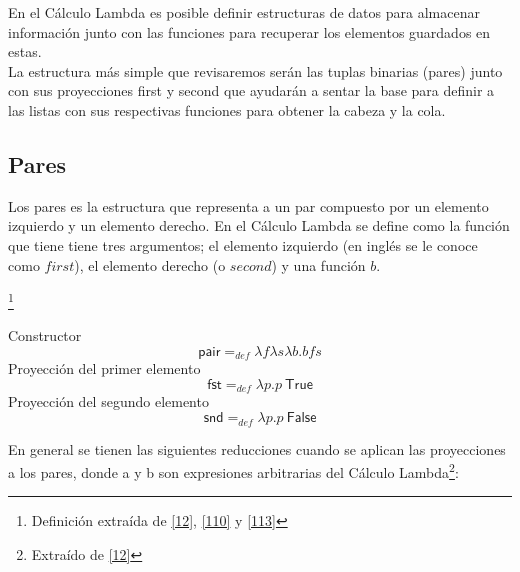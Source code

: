             En el Cálculo Lambda es posible definir estructuras de datos para almacenar información junto con las funciones para recuperar los elementos guardados en estas. \\
	 La estructura más simple que revisaremos serán las tuplas binarias (pares) junto con sus proyecciones \textsf{first} y \textsf{second} que ayudarán a sentar la base para definir a las listas con sus respectivas funciones para obtener la cabeza y la cola. 
    
            \subsection{Pares}

                Los pares es la estructura que representa a un par compuesto por un elemento izquierdo y un elemento derecho. En el Cálculo Lambda se define como la función que tiene tiene tres argumentos; el elemento izquierdo (en inglés se le conoce como $first$), el elemento derecho (o $second$) y una función $b$.
        
                \begin{definition}\footnote{Definición extraída de \hyperlink{12}{[12]},  \hyperlink{110}{[110]} y   \hyperlink{113}{[113]}}
            
                    Constructor
                        $$\mathsf{pair} =_{def} \lambda f\lambda s\lambda b. bfs$$
                    Proyección del primer elemento
                        $$\mathsf{fst} =_{def} \lambda p.p \ \textsf{True}$$
                    Proyección del segundo elemento
                        $$\mathsf{snd} =_{def} \lambda p.p \ \textsf{False}$$

                \end{definition}

    En general se tienen las siguientes reducciones cuando se aplican las proyecciones a los pares, donde a y b son expresiones arbitrarias del Cálculo Lambda\footnote{Extraído de \hyperlink{12}{[12]}}:


